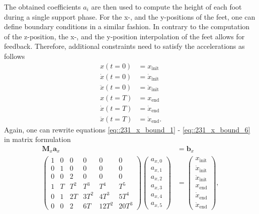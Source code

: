 The obtained coefficients $a_i$ are then used to compute the height of each foot during a single support phase. For the x-, and the y-positions of the feet, one can define boundary conditions in a similar fashion. In contrary to the computation of the z-position, the x-, and the y-position interpolation of the feet allows for feedback. Therefore, additional constraints need to satisfy the accelerations as follows
\begin{align}
	x(t = 0) &= x_\text{init} 
	\label{eq::231_x_bound_1}\\
	\dot{x}(t=0) &= \dot{x}_\text{init} \\
	\ddot{x}(t=0) &= \ddot{x}_\text{init} \\
	x(t=T) &= x_\text{end}\\
	\dot{x}(t=T) &= \dot{x}_\text{end} \\
	\ddot{x}(t=T) &= \ddot{x}_\text{end}.
	\label{eq::231_x_bound_6}
\end{align}
Again, one can rewrite equations \ref{eq::231_x_bound_1} - \ref{eq::231_x_bound_6} in matrix formulation
\begin{align}
	\bm{M}_x\bm{a}_x &= \bm{b}_x \\
	\begin{pmatrix}
		1 & 0 & 0 & 0 & 0 & 0 \\
		0 & 1 & 0 & 0 & 0 & 0 \\
		0 & 0 & 2 & 0 & 0 & 0 \\
		1 & T & T^2 & T^3 & T^4 & T^5 \\
		0 & 1 & 2 T & 3 T^2 & 4 T^3 & 5 T^4 \\
		0 & 0 & 2 & 6 T & 12 T^2 & 20 T^3
	\end{pmatrix}
	\begin{pmatrix}
		a_{x,0} \\
		a_{x,1} \\
		a_{x,2} \\
		a_{x,3} \\
		a_{x,4} \\
		a_{x,5}
	\end{pmatrix} &=
	\begin{pmatrix}
		x_\text{init} \\
		\dot{x}_\text{init} \\
		\ddot{x}_\text{init} \\
		x_\text{end} \\
		\dot{x}_\text{end} \\
		\ddot{x}_\text{end} 
	\end{pmatrix},
\end{align}
